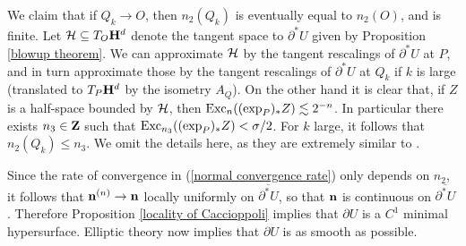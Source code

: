 We claim that if $Q_k \to O$, then $n_2(Q_k)$ is eventually equal to $n_2(O)$, and is finite.
Let $\mathcal H \subseteq T_O\mathbf H^d$ denote the tangent space to $\partial^* U$ given by Proposition \ref{blowup theorem}.
We can approximate $\mathcal H$ by the tangent rescalings of $\partial^* U$ at $P$, and in turn approximate those by the tangent rescalings of $\partial^* U$ at $Q_k$ if $k$ is large (translated to $T_P \mathbf H^d$ by the isometry $A_Q$).
On the other hand it is clear that, if $Z$ is a half-space bounded by $\mathcal H$, then $\operatorname{Exc}_n((\exp_P)_* Z) \lesssim 2^{-n}$.
In particular there exists $n_3 \in \mathbf{Z}$ such that $\operatorname{Exc}_{n_3}((\exp_P)_* Z) < \sigma/2$.
For $k$ large, it follows that $n_2(Q_k) \leq n_3$.
We omit the details here, as they are extremely similar to \cite[Teorema 4]{Miranda67}.

Since the rate of convergence in (\ref{normal convergence rate}) only depends on $n_2$, it follows that $\mathbf n^{(n)} \to \mathbf n$ locally uniformly on $\overline{\partial^* U}$, so that $\mathbf n$ is continuous on $\overline{\partial^* U}$.
Therefore Proposition \ref{locality of Caccioppoli} implies that $\partial U$ is a $C^1$ minimal hypersurface.
Elliptic theory \cite{morrey2009multiple} now implies that $\partial U$ is as smooth as possible.